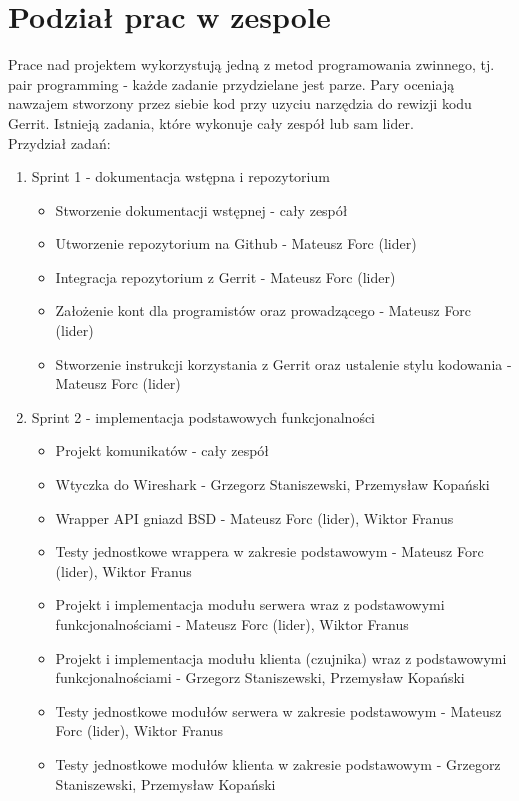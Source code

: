 \documentclass[a4paper,11pt]{article}
\begin{document}
\section{Podział prac w zespole}
Prace nad projektem wykorzystują jedną z metod programowania zwinnego,
tj. pair programming - każde zadanie przydzielane jest parze.
Pary oceniają nawzajem stworzony przez siebie kod przy uzyciu narzędzia do rewizji kodu Gerrit.
Istnieją zadania, które wykonuje cały zespół lub sam lider. \\
Przydział zadań:
\begin{enumerate}
\item Sprint 1 - dokumentacja wstępna i repozytorium
\begin{itemize}
\item Stworzenie dokumentacji wstępnej - cały zespół
\item Utworzenie repozytorium na Github - Mateusz Forc (lider)
\item Integracja repozytorium z Gerrit - Mateusz Forc (lider)
\item Założenie kont dla programistów oraz prowadzącego - Mateusz Forc (lider)
\item Stworzenie instrukcji korzystania z Gerrit oraz ustalenie stylu kodowania
      - Mateusz Forc (lider)
\end{itemize}
\item Sprint 2 - implementacja podstawowych funkcjonalności
\begin{itemize}
\item Projekt komunikatów - cały zespół
\item Wtyczka do Wireshark - Grzegorz Staniszewski, Przemysław Kopański
\item Wrapper API gniazd BSD - Mateusz Forc (lider), Wiktor Franus
\item Testy jednostkowe wrappera w zakresie podstawowym - Mateusz Forc (lider), Wiktor Franus
\item Projekt i implementacja modułu serwera wraz z podstawowymi funkcjonalnościami
      - Mateusz Forc (lider), Wiktor Franus
\item Projekt i implementacja modułu klienta (czujnika) wraz z podstawowymi funkcjonalnościami
      - Grzegorz Staniszewski, Przemysław Kopański
\item Testy jednostkowe modułów serwera w zakresie podstawowym - Mateusz Forc (lider), Wiktor Franus
\item Testy jednostkowe modułów klienta w zakresie podstawowym
      - Grzegorz Staniszewski, Przemysław Kopański

\end{itemize}
\end{enumerate}
\end{document}

